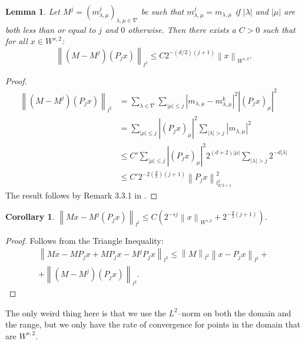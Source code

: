 \documentclass[12pt]{amsart}
\newtheorem{corollary}{Corollary}
\newtheorem{lemma}{Lemma}
\newcommand{\card}[1]{{\lvert#1\rvert}}
\newcommand{\abs}[1]{\ensuremath{\left\lvert #1\right\rvert}}
\newcommand{\norm}[1]{\ensuremath{\left\lVert #1\right\rVert}}
\begin{document}
\begin{lemma}
	Let $M^j=(m^j_{\lambda,\mu})_{\lambda,\mu \in \nabla}$ be such that $m^j_{\lambda,\mu} = m_{\lambda,\mu}$ if $\card{\lambda}$ and $\card{\mu}$ are both less than or equal to $j$ and $0$ otherwise. Then there exists a $C > 0$ such that for all $x \in W^{s,2}$:
	\begin{equation}
		\norm{(M-M^j)(P_jx)}_{l^2} \leq C2^{-(d/2)(j+1)} \norm{x}_{W^{s,2}}.
	\end{equation}
\end{lemma}
\begin{proof}
	\begin{align}
		\norm{(M-M^j)(P_j x)}_{l^2} &= \sum_{\lambda \in \nabla} \sum_{\card{\mu}\leq j} \abs{m_{\lambda,\mu}-m^k_{\lambda,\mu}}^2 \abs{(P_j x)_\mu}^2 \\
		&= \sum_{\card{\mu}\leq j}\abs{(P_j x)_\mu}^2 \sum_{\card{\lambda}>j}\abs{m_{\lambda,\mu}}^2 \\
		&\leq C'\sum_{\card{\mu}\leq j}\abs{(P_j x)_\mu}^2 2^{(d+2)\card{\mu}}\sum_{\card{\lambda}>j}2^{-d\card{\lambda}} \\
		&\leq C' 2^{-2(\frac{d}{2})(j+1)}\norm{P_j x}^2_{l^2_{d/2+1}}
	\end{align}
	The result follows by Remark 3.3.1 in \cite{}.
\end{proof}

\begin{corollary}
	$\norm{Mx - M^j(P_j x)}_{l^2} \leq C \left( 2^{-sj}\norm{x}_{W^{s,2}} + 2^{-\frac{d}{2}(j+1)} \right)$.
\end{corollary}
\begin{proof}
	Follows from the Triangle Inequality:
	\begin{multline}
		\norm{Mx - M P_j x + M P_j x - M^j P_j x}_{l^2} \leq \norm{M}_{l^2} \norm{x - P_j x}_{l^2} + \\ + \norm{(M-M^j)(P_jx)}_{l^2}.
	\end{multline}
\end{proof}

The only weird thing here is that we use the $L^2$--norm on both the domain and the range, but we only have the rate of convergence for points in the domain that are $W^{s,2}$.
\end{document}
